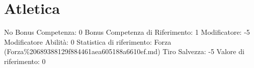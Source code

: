 \section{Atletica}\label{atletica}

\begin{description}
\tightlist
\item[Tags: ABI]
No Bonus Competenza: 0 Bonus Competenza di Riferimento: 1 Modificatore:
-5 Modificatore Abilità: 0 Statistica di riferimento: Forza
(Forza\%20689388129f884461aea605188a6610ef.md) Tiro Salvezza: -5 Valore
di riferimento: 0
\end{description}
